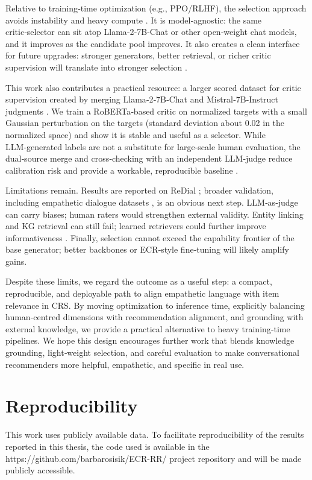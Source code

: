\documentclass[12pt]{article}
\begin{document}
  Relative to training‑time optimization (e.g., PPO/RLHF), the selection approach avoids instability and heavy compute \citep{ppo_wikipedia,rlhf_wikipedia}. It is model‑agnostic: the same critic‑selector can sit atop Llama‑2‑7B‑Chat or other open‑weight chat models, and it improves as the candidate pool improves. It also creates a clean interface for future upgrades: stronger generators, better retrieval, or richer critic supervision will translate into stronger selection \citep{brown2020language}.
  
  This work also contributes a practical resource: a larger scored dataset for critic supervision created by merging Llama‑2‑7B‑Chat and Mistral‑7B‑Instruct judgments \citep{meta2023llama2,mistral2023}. We train a RoBERTa‑based critic \citep{liu2019roberta} on normalized targets with a small Gaussian perturbation on the targets (standard deviation about 0.02 in the normalized space) and show it is stable and useful as a selector. While LLM‑generated labels are not a substitute for large‑scale human evaluation, the dual‑source merge and cross‑checking with an independent LLM‑judge reduce calibration risk and provide a workable, reproducible baseline \citep{evidently_llm_judge}.
  
  Limitations remain. Results are reported on ReDial \citep{charlin2018redial}; broader validation, including empathetic dialogue datasets \citep{rashkin2019empathetic}, is an obvious next step. LLM‑as‑judge can carry biases; human raters would strengthen external validity. Entity linking and KG retrieval can still fail; learned retrievers could further improve informativeness \citep{lewis2020rag}. Finally, selection cannot exceed the capability frontier of the base generator; better backbones or ECR‑style fine‑tuning \citep{zhang2024ecr} will likely amplify gains.
  
  Despite these limits, we regard the outcome as a useful step: a compact, reproducible, and deployable path to align empathetic language with item relevance in CRS. By moving optimization to inference time, explicitly balancing human‑centred dimensions with recommendation alignment, and grounding with external knowledge, we provide a practical alternative to heavy training‑time pipelines. We hope this design encourages further work that blends knowledge grounding, light‑weight selection, and careful evaluation to make conversational recommenders more helpful, empathetic, and specific in real use.
  
  \section*{Reproducibility}
  This work uses publicly available data. To facilitate reproducibility of the results reported in this thesis, the code used is available in the https://github.com/barbarosisik/ECR-RR/ project repository and will be made publicly accessible.
  
\end{document}
